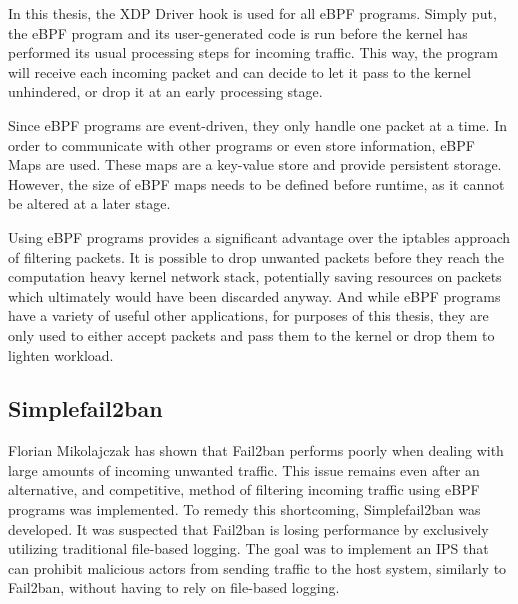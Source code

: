 In this thesis, the \ac{XDP} Driver hook is used for all \ac{eBPF} programs.
Simply put, the \ac{eBPF} program and its user-generated code is run before the kernel has performed its usual processing steps for incoming traffic.
This way, the program will receive each incoming packet and can decide to let it pass to the kernel unhindered, or drop it at an early processing stage.

Since \ac{eBPF} programs are event-driven, they only handle one packet at a time.
In order to communicate with other programs or even store information, \ac{eBPF} Maps are used.
These maps are a key-value store and provide persistent storage.
However, the size of \ac{eBPF} maps needs to be defined before runtime, as it cannot be altered at a later stage.\cite{mikolajczak:ebpf}

Using \ac{eBPF} programs provides a significant advantage over the iptables approach of filtering packets.
It is possible to drop unwanted packets before they reach the computation heavy kernel network stack, potentially saving resources on packets which ultimately would have been discarded anyway.
And while \ac{eBPF} programs have a variety of useful other applications, for purposes of this thesis, they are only used to either accept packets and pass them to the kernel or drop them to lighten workload.

\subsection{Simplefail2ban}
Florian Mikolajczak has shown\cite{mikolajczak:ebpf} that Fail2ban performs poorly when dealing with large amounts of incoming unwanted traffic.
This issue remains even after an alternative, and competitive, method of filtering incoming traffic using \ac{eBPF} programs was implemented.
To remedy this shortcoming, Simplefail2ban was developed\cite{raatschen:ipc}.
It was suspected that Fail2ban is losing performance by exclusively utilizing traditional file-based logging.
The goal was to implement an \ac{IPS} that can prohibit malicious actors from sending traffic to the host system, similarly to Fail2ban, without having to rely on file-based logging.

